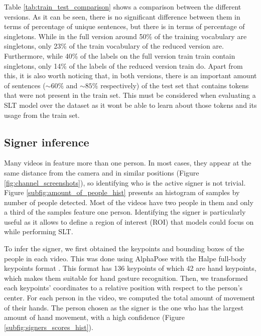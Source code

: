 

Table \ref{tab:train_test_comparison} shows a comparison between the different versions. As it can be seen, there is no significant difference between them in terms of percentage of unique sentences, but there is in terms of percentage of singletons. While in the full version around 50\% of the training vocabulary are singletons, only 23\% of the train vocabulary of the reduced version are. Furthermore, while 40\% of the labels on the full version train train contain singletons, only 14\% of the labels of the reduced version train do. Apart from this, it is also worth noticing that, in both versions, there is an important amount of sentences (\(\sim60\%\) and \(\sim85\%\) respectively) of the test set that contains tokens that were not present in the train set. This must be considered when evaluating a SLT model over the dataset as it wont be able to learn about those tokens and its usage from the train set.

\subsection{Signer inference}
\label{subsec:signer_inference}

Many videos in \dbname feature more than one person. In most cases, they appear at the same distance from the camera and in similar positions (Figure \ref{fig:channel_screenshots}), so identifying who is the active signer is not trivial. Figure \ref{subfig:amount_of_people_hist} presents an histogram of samples by number of people detected. Most of the videos have two people in them and only a third of the samples feature one person. Identifying the signer is particularly useful as it allows to define a region of interest (ROI) that models could focus on while performing SLT.



To infer the signer, we first obtained the keypoints and bounding boxes of the people in each video. This was done using AlphaPose with the Halpe full-body keypoints format \cite{fang2017rmpe}. This format has 136 keypoints of which 42 are hand keypoints, which makes them suitable for hand gesture recognition. Then, we transformed each keypoints' coordinates to a relative position with respect to the person's center. For each person in the video, we computed the total amount of movement of their hands. The person chosen as the signer is the one who has the largest amount of hand movement, with a high confidence (Figure \ref{subfig:signers_scores_hist}). 


